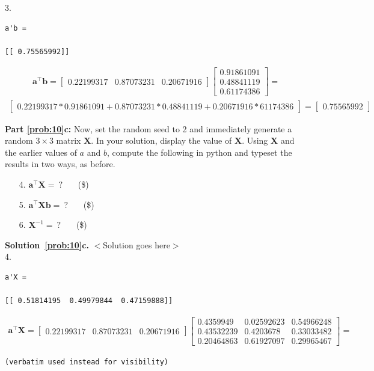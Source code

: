\documentclass[10pt]{article}
\begin{document}
\begin{enumerate}
3.

\begin{verbatim}
a'b =

[[ 0.75565992]]

\end{verbatim}

\begin{eqnarray*}
\mathbf{a}^\top \mathbf{b} =
    \begin{bmatrix}
	0.22199317 & 0.87073231 & 0.20671916
    \end{bmatrix}
    \begin{bmatrix}
	0.91861091 \\[0.3em]
    0.48841119 \\[0.3em]
    0.61174386
    \end{bmatrix} = 
\end{eqnarray*}
\begin{eqnarray*}
	\begin{bmatrix}
	0.22199317 * 0.91861091 +
    0.87073231 * 0.48841119 +
    0.20671916 * 61174386
	\end{bmatrix} =
    \begin{bmatrix}
    0.75565992
    \end{bmatrix}
\end{eqnarray*}

{\bf Part \ref{prob:10}c:} Now, set the random seed to 2 and immediately generate a random $3 \times 3$ matrix $\mathbf{X}$.  In your solution, display the value of $\mathbf{X}$.  Using $\mathbf{X}$ and the earlier values of $a$ and $b$, compute the following in python and typeset the results in two ways, as before.
\begin{enumerate}
\item[4.] $\mathbf{a}^\top\mathbf{X} = ~?$ ~~~(\$)
\item[5.] $\mathbf{a}^\top\mathbf{X}\mathbf{b} = ~?$ ~~~(\$)
\item[6.] $\mathbf{X}^{-1} = ~?$ ~~~(\$)
\end{enumerate}

{\bf Solution~\ref{prob:10}c.} $<$Solution goes here$>$\\

4.

\begin{verbatim}
a'X =

[[ 0.51814195  0.49979844  0.47159888]] 

\end{verbatim}

\begin{eqnarray*}
\mathbf{a}^\top \mathbf{X} =
    \begin{bmatrix}
	0.22199317 & 0.87073231 & 0.20671916
    \end{bmatrix}
    \begin{bmatrix}
    0.4359949 & 0.02592623 & 0.54966248 \\[0.3em] 
    0.43532239 & 0.4203678 & 0.33033482 \\[0.3em] 
    0.20464863 & 0.61927097 & 0.29965467
    \end{bmatrix} = 
\end{eqnarray*}
\begin{verbatim}
(verbatim used instead for visibility)


\end{verbatim}
\end{enumerate}
\end{document}
